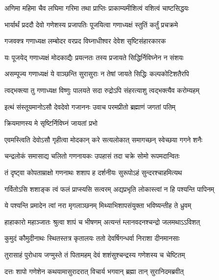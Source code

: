 \twolineshloka
{अणिमा महिमा चैव लघिमा गरिमा तथा}
{प्राप्तिः प्राकाम्यमीशित्वं वशित्वं चाष्टसिद्धयः}%

\twolineshloka
{भार्यार्थं प्रददौ देवो गणेशस्य प्रजापतिः}
{पूजयित्वा गणाध्यक्षं स्तुतिं कर्तुं प्रचक्रमे}%


\twolineshloka
{गजवक्त्र गणाध्यक्ष लम्बोदर वरप्रद}
{विघ्नाधीश्वर देवेश सृष्टिसंहारकारक}%

\twolineshloka
{यः पूजयेद् गणाध्यक्षं मोदकाद्यैः प्रयत्नतः}
{तस्य प्रजायते सिद्धिर्निविघ्नेन न संशयः}%

\twolineshloka
{असम्पूज्य गणाध्यक्षं ये वाञ्छन्ति सुरासुराः}
{न तेषां जायते सिद्धिः कल्पकोटिशतैरपि}%

\twolineshloka
{त्वद्भक्त्या तु गणाध्यक्ष विष्णुः पालयते सदा}
{रुद्रोऽपि संहरत्याशु त्वद्भक्त्यैव करोम्यहम्}%

\twolineshloka
{इत्थं संस्तूयमानोऽसौ देवदेवो गजाननः}
{उवाच परमप्रीतो ब्रह्माणं जगतां पतिम्}%



\onelineshloka
{क्रियमाणस्य मे सृष्टिर्निविघ्नं जायतां प्रभो}%

\twolineshloka
{एवमस्त्विति देवोऽसौ गृहीत्वा मोदकान् करे}
{सत्यलोकात् समागच्छन् स्वेच्छया गगने शनैः}%

\twolineshloka
{चन्द्रलोकं समासाद्य चलितो गणनायकः}
{उपहासं तदा चक्रे सोमो रूपमदान्वितः}%

\twolineshloka
{तं दृष्ट्वा कोपताम्राक्षो गणनाथः शशाप ह}
{दर्शनीयः सुरूपोऽहं सुन्दरश्चाहमित्यथ}%

\twolineshloka
{गर्वितोऽसि शशाङ्क त्वं फलं प्राप्स्यसि सत्वरम्}
{अद्यप्रभृति लोकास्त्वां न हि पश्यन्ति पापिनम्}%

\twolineshloka
{ये पश्यन्ति प्रमादेन त्वां नरा मृगलाञ्छनम्}
{मिथ्याभिशापसंयुक्ता भविष्यन्तीह ते ध्रुवम्}%

\twolineshloka
{हाहाकारो महाञ्जातः श्रुत्वा शापं च भीषणम्}
{अत्यन्तं म्लानवदनश्चन्द्रो जलमथाऽऽविशत्}%

\twolineshloka
{कुमुदं कौमुदीनाथः स्थितस्तत्र कृतालयः}
{ततो देवर्षिगन्धर्वा निराशा दीनमानसाः}%

\twolineshloka
{तुरासाहं पुरोधाय जग्मुस्ते तं पितामहम्}
{देवं शशंसुश्चन्द्रस्य गणेशस्य च चेष्टितम्}%

\twolineshloka
{दत्तः शापो गणेशेन कथयामासुरादरात्}
{विचार्य भगवान् ब्रह्मा तान् सुरानिदमब्रवीत्}%

